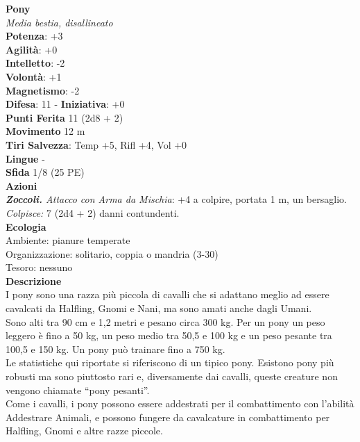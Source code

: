 \begin{multicols}{2}
\medskip\textbf{Pony}\\
\emph{Media bestia, disallineato}\\
\textbf{Potenza}: +3\\
\textbf{Agilità}: +0\\
\textbf{Intelletto}: -2\\
\textbf{Volontà}: +1\\
\textbf{Magnetismo}: -2\\
\textbf{Difesa}: 11 - \textbf{Iniziativa}: +0\\
\textbf{Punti Ferita} 11 (2d8 + 2)\\
\textbf{Movimento} 12 m\\
\textbf{Tiri Salvezza}: Temp +5, Rifl +4, Vol +0 \\
\textbf{Lingue} -\\
\textbf{Sfida} 1/8 (25 PE)\smallskip\\
\smallskip\textbf{Azioni}\\
\emph{\textbf{Zoccoli.} Attacco con Arma da Mischia}: +4 a colpire, portata 1 m, un bersaglio.\\
\emph{Colpisce:} 7 (2d4 + 2) danni contundenti.\\
\textbf{Ecologia}\\
Ambiente: pianure temperate\\
Organizzazione: solitario, coppia o mandria (3-30)\\
Tesoro: nessuno\\
\textbf{Descrizione}\\

I pony sono una razza più piccola di cavalli che si adattano meglio ad essere cavalcati da Halfling, Gnomi e Nani, ma sono amati anche dagli Umani.\\

Sono alti tra 90 cm e 1,2 metri e pesano circa 300 kg. Per un pony un peso leggero è fino a 50 kg, un peso medio tra 50,5 e 100 kg e un peso pesante tra 100,5 e 150 kg. Un pony può trainare fino a 750 kg.\\

Le statistiche qui riportate si riferiscono di un tipico pony. Esistono pony più robusti  ma sono piuttosto rari e, diversamente dai cavalli, queste creature non vengono chiamate “pony pesanti”.\\

Come i cavalli, i pony possono essere addestrati per il combattimento con l’abilità Addestrare Animali, e possono fungere da cavalcature in combattimento per Halfling, Gnomi e altre razze piccole. \\


\end{multicols}

